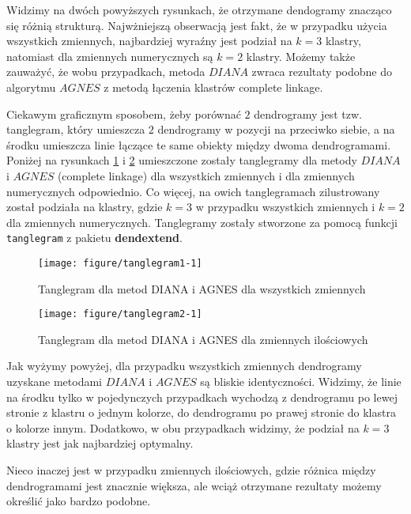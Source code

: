 \documentclass[12pt, a4paper]{article}\usepackage[]{graphicx}\usepackage[]{xcolor}
\makeatletter
\def\maxwidth{ %
  \ifdim\Gin@nat@width>\linewidth
    \linewidth
  \else
    \Gin@nat@width
  \fi
}
\newenvironment{knitrout}{}{} %
\makeatother
\begin{document}
Widzimy na dwóch powyższych rysunkach, że otrzymane dendogramy znacząco się różnią strukturą. Najwżniejszą obserwacją jest fakt, że w przypadku użycia wszystkich zmiennych, najbardziej wyraźny jest podział na $k=3$ klastry, natomiast dla zmiennych numerycznych są $k=2$ klastry. Możemy także zauważyć, że  wobu przypadkach, metoda $DIANA$ zwraca rezultaty podobne do algorytmu $AGNES$ z metodą łączenia klastrów complete linkage. 

\par  Ciekawym graficznym sposobem, żeby porównać $2$ dendrogramy jest tzw. tanglegram, który umieszcza $2$ dendrogramy w pozycji na przeciwko siebie, a na środku umieszcza linie łączące te same obiekty między dwoma dendrogramami. Poniżej na rysunkach \ref{fig:tanglegram1} i \ref{fig:tanglegram2} umieszczone zostały tanglegramy dla metody $DIANA$ i $AGNES$ (complete linkage) dla wszystkich zmiennych i dla zmiennych numerycznych odpowiednio. Co więcej, na owich tanglegramach zilustrowany został podziała na klastry, gdzie $k=3$ w przypadku wszystkich zmiennych i $k=2$ dla zmiennych numerycznych. Tanglegramy zostały stworzone za pomocą funkcji \texttt{tanglegram} z pakietu \textbf{dendextend}.


\begin{knitrout}
\color{fgcolor}\begin{figure}[H]

{\centering \texttt{[image: figure/tanglegram1-1]} 

}

\caption[Tanglegram dla metod DIANA i AGNES dla wszystkich zmiennych]{Tanglegram dla metod DIANA i AGNES dla wszystkich zmiennych}\label{fig:tanglegram1}
\end{figure}

\end{knitrout}

\begin{knitrout}
\color{fgcolor}\begin{figure}[H]

{\centering \texttt{[image: figure/tanglegram2-1]} 

}

\caption[Tanglegram dla metod DIANA i AGNES dla zmiennych ilościowych]{Tanglegram dla metod DIANA i AGNES dla zmiennych ilościowych}\label{fig:tanglegram2}
\end{figure}

\end{knitrout}
Jak wyżymy powyżej, dla przypadku wszystkich zmiennych dendrogramy uzyskane metodami $DIANA$ i $AGNES$ są bliskie identyczności. Widzimy, że linie na środku tylko w pojedynczych przypadkach wychodzą z dendrogramu po lewej stronie z klastru o jednym kolorze, do dendrogramu po prawej stronie do klastra o kolorze innym. Dodatkowo, w obu przypadkach widzimy, że podział na $k=3$ klastry jest jak najbardziej optymalny. 
\par Nieco inaczej jest w przypadku zmiennych ilościowych, gdzie różnica między dendrogramami jest znacznie większa, ale wciąż otrzymane rezultaty możemy określić jako bardzo podobne.
\end{document}
